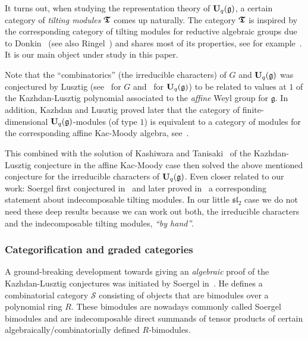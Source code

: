 It turns out, when studying the 
representation theory of $\boldsymbol{\mathrm{U}}_q(\mathfrak{g})$, 
a certain category of \textit{tilting modules} $\boldsymbol{\mathfrak{T}}$ 
comes up naturally. The category $\boldsymbol{\mathfrak{T}}$ is inspired 
by the corresponding category of tilting modules 
for reductive algebraic groups due to Donkin~\cite{don} 
(see also Ringel~\cite{ringel}) and shares most of its 
properties, see for example~\cite{an1}. It is our main object under study in this paper.




Note that the ``combinatorics'' (the irreducible characters) 
of $G$ and $\boldsymbol{\mathrm{U}}_q(\mathfrak{g})$ was conjectured by 
Lusztig (see~\cite{lu3} for $G$ and~\cite{lu1} for 
$\boldsymbol{\mathrm{U}}_q(\mathfrak{g})$) to be related to values at $1$ 
of the Kazhdan-Lusztig polynomial associated to the 
\textit{affine} Weyl group for $\mathfrak{g}$. In addition, 
Kazhdan and Lusztig proved later that the category 
of finite-dimensional $\boldsymbol{\mathrm{U}}_q(\mathfrak{g})$-modules 
(of type $1$) is equivalent to a category of 
modules for the corresponding affine Kac-Moody algebra, see~\cite{kalu}.



This combined with the solution of Kashiwara 
and Tanisaki~\cite{kt} of the Kazhdan-Lusztig 
conjecture in the affine Kac-Moody case then 
solved the above mentioned conjecture for the 
irreducible characters of $\boldsymbol{\mathrm{U}}_q(\mathfrak{g})$. 
Even closer related to our work: Soergel first 
conjectured in~\cite{soe3} and later proved 
in~\cite{soe4} a corresponding statement about 
indecomposable tilting modules. In our 
little $\mathfrak{sl}_2$ case we do not need 
these deep results because we can work out 
both, the irreducible characters and the 
indecomposable tilting modules, \textit{``by hand''}. 





\subsubsection{Categorification and graded categories}\label{subsub-intropart3}




A ground-breaking development towards 
giving an 
\textit{algebraic} proof of the Kazhdan-Lusztig conjectures 
was initiated by Soergel in~\cite{soe2}. He defines a 
combinatorial category $\mathcal S$ consisting of 
objects that are bimodules over a polynomial ring $R$. 
These bimodules are nowadays commonly called 
Soergel bimodules and are indecomposable 
direct summands of tensor products of certain 
algebraically/combinatorially defined $R$-bimodules.




